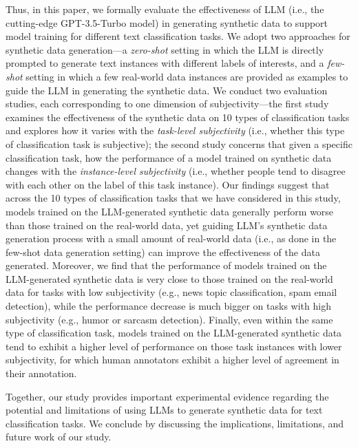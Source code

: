 Thus, in this paper, we formally evaluate the effectiveness of LLM (i.e., the cutting-edge GPT-3.5-Turbo model) in generating synthetic data to support model training for different text classification tasks. We adopt two approaches for synthetic data generation---a {\em zero-shot} setting in which the LLM is directly prompted to generate text instances with different labels of interests, and a {\em few-shot} setting in which a few real-world data instances are provided as examples to guide the LLM in generating the synthetic data. We conduct two evaluation studies, each corresponding to one dimension of subjectivity---the first study examines the effectiveness of the synthetic data on 10 types of classification tasks and explores how it varies with the {\em task-level subjectivity} (i.e., whether this type of classification task is subjective); the second study concerns that given a specific classification task, how the performance of a model trained on synthetic data changes with the {\em instance-level subjectivity} (i.e., whether people tend to disagree with each other on the label of this task instance).  Our findings suggest that across the 10 types of classification tasks that we have considered in this study, models trained on the LLM-generated synthetic data generally perform worse than those trained on the real-world data, yet guiding LLM's synthetic data generation process with a small amount of real-world data (i.e., as done in the few-shot data generation setting) can improve the effectiveness of the data generated. 
Moreover, we find that the performance of models trained on the LLM-generated synthetic data is very close to those trained on the real-world data for tasks with low subjectivity (e.g., news topic classification, spam email detection), while the performance decrease is much bigger on tasks with high subjectivity (e.g., humor or sarcasm detection). Finally, even within the same type of classification task, models trained on the LLM-generated synthetic data tend to exhibit a higher level of performance on those task instances with lower subjectivity, for which human annotators exhibit a higher level of agreement in their annotation. 

Together, our study provides important experimental evidence regarding the potential and limitations of using LLMs to generate synthetic data for text classification tasks. We conclude by discussing the implications, limitations, and future work of our study. 

